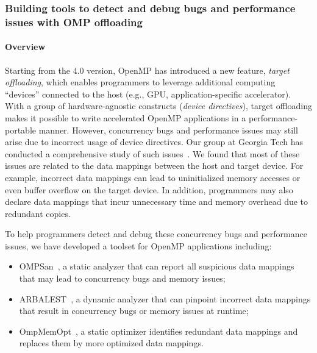 \subsubsection{ Building tools to detect and debug bugs and performance issues with OMP offloading}

\paragraph{Overview}
Starting from the 4.0 version, OpenMP has introduced a new feature, \textit{target offloading}, which enables programmers to leverage additional computing ``devices'' connected to the host (e.g., GPU, application-specific accelerator).
With a group of hardware-agnostic constructs (\textit{device directives}), target offloading makes it possible to write accelerated OpenMP applications in a performance-portable manner. However, concurrency bugs and performance issues may still arise due to  incorrect usage of device directives. 
Our group at Georgia Tech has conducted a comprehensive study of such issues~\cite{yu2020study}. We found that most of these issues are related to the data mappings between the host and target device.
For example, incorrect data mappings can lead to uninitialized memory accesses or even buffer overflow on the target device. In addition, programmers may also declare data mappings that incur unnecessary time and memory overhead due to redundant copies.

To help programmers detect and debug these concurrency bugs and performance issues, we have developed a toolset for OpenMP applications including:
\begin{itemize}
    \item OMPSan~\cite{barua2019ompsan}, a static analyzer that can report all suspicious data mappings that may lead to concurrency bugs and memory issues;
    \item ARBALEST~\cite{yu2021arbalest}, a dynamic analyzer that can pinpoint incorrect data mappings that result in concurrency bugs or memory issues at runtime;
    \item OmpMemOpt~\cite{barua2020ompmemopt}, a static optimizer identifies redundant data mappings and replaces them by more optimized data mappings.
\end{itemize}

